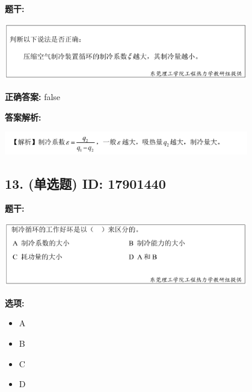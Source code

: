 \documentclass[12pt]{article}
\begin{document}
\textbf{题干:}


\begin{center}\includegraphics[width=0.8\textwidth, height=0.25\textheight, keepaspectratio]{question_12_17901433/title_img_1.png}\end{center}

\textbf{正确答案:}
false

\textbf{答案解析:}


\begin{center}\includegraphics[width=0.8\textwidth, height=0.25\textheight, keepaspectratio]{question_12_17901433/correct_replay_img_1.png}\end{center}

\vspace{0.5em}\hrulefill\vspace{1em}

\subsection*{13. (单选题) \small ID: 17901440}

\textbf{题干:}


\begin{center}\includegraphics[width=0.8\textwidth, height=0.25\textheight, keepaspectratio]{question_13_17901440/title_img_1.png}\end{center}

\textbf{选项:}
\begin{itemize}[leftmargin=*]
  \item A

  \item B

  \item C

  \item D

\end{itemize}
\end{document}
